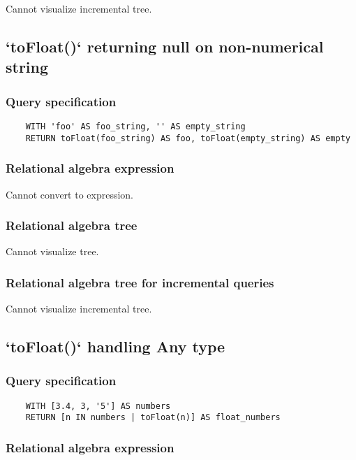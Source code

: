 	Cannot visualize incremental tree.
	\subsection{`toFloat()` returning null on non-numerical string}

	\subsubsection*{Query specification}

	\begin{lstlisting}
	WITH 'foo' AS foo_string, '' AS empty_string
	RETURN toFloat(foo_string) AS foo, toFloat(empty_string) AS empty
	\end{lstlisting}


	\subsubsection*{Relational algebra expression}

	Cannot convert to expression.

	\subsubsection*{Relational algebra tree}

	Cannot visualize tree.

	\subsubsection*{Relational algebra tree for incremental queries}

	Cannot visualize incremental tree.
	\subsection{`toFloat()` handling Any type}

	\subsubsection*{Query specification}

	\begin{lstlisting}
	WITH [3.4, 3, '5'] AS numbers
	RETURN [n IN numbers | toFloat(n)] AS float_numbers
	\end{lstlisting}


	\subsubsection*{Relational algebra expression}

